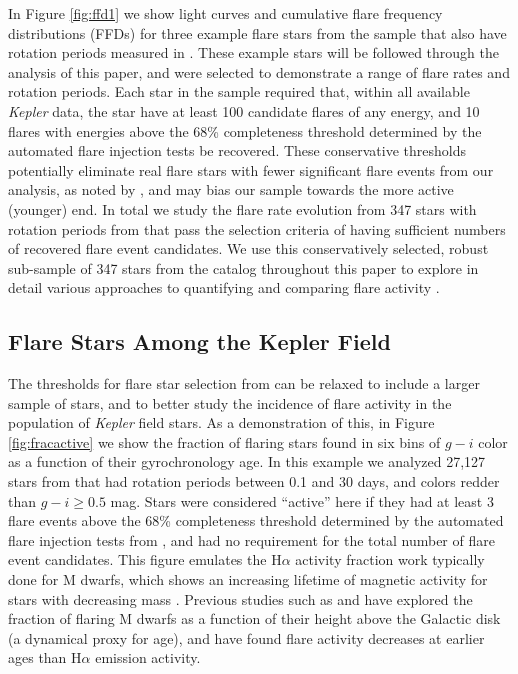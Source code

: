 \documentclass[preprint2]{aastex62}
\newcommand{\Kepler}{\textsl{Kepler}\xspace}
\begin{document}
In Figure \ref{fig:ffd1} we show light curves and cumulative flare frequency distributions (FFDs) for three example flare stars from the \citet{davenport2016} sample that also have rotation periods measured in \citet{mcquillan2014}. These example stars will be followed through the analysis of this paper, and were selected to demonstrate a range of flare rates and rotation periods. 
Each star in the \citet{davenport2016} sample required that, within all available \Kepler data, the star have at least 100 candidate flares of any energy, and 10 flares with energies above the 68\% completeness threshold determined by the automated flare injection tests be recovered. These conservative thresholds potentially eliminate real flare stars with fewer significant flare events from our analysis, as noted by \citet{van-doorsselaere2017}, and may bias our sample towards the more active (younger) end. 
In total we study the flare rate evolution from 347 stars with rotation periods from \citet{mcquillan2014} that pass the \citet{davenport2016} selection criteria of having sufficient numbers of recovered flare event candidates. We use this conservatively selected, robust sub-sample of 347 stars from the \citet{davenport2016} catalog throughout this paper to explore in detail various approaches to quantifying and comparing flare activity .




\subsection{Flare Stars Among the Kepler Field}

The thresholds for flare star selection from \citet{davenport2016} can be relaxed to include a larger sample of stars, and to better study the incidence of flare activity in the population of \Kepler field stars. As a demonstration of this, in Figure \ref{fig:fracactive} we show the fraction of flaring stars found in six bins of $g-i$ color as a function of their gyrochronology age. In this example we analyzed 27,127 stars from \citet{mcquillan2014} that had rotation periods between 0.1 and 30 days, and colors redder than $g-i \ge 0.5$ mag. Stars were considered ``active'' here if they had at least 3 flare events above the 68\% completeness threshold determined by the automated flare injection tests from \citet{davenport2016}, and had no requirement for the total number of flare event candidates. This figure emulates the H$\alpha$ activity fraction work typically done for M dwarfs, which shows an increasing lifetime of magnetic activity for stars with decreasing mass \citep[e.g.][]{west2008}. Previous studies such as \citet{kowalski2009} and \citet{hilton2010} have explored the fraction of flaring M dwarfs as a function of their height above the Galactic disk (a dynamical proxy for age), and have found flare activity decreases at earlier ages than H$\alpha$ emission activity. 
\end{document}

